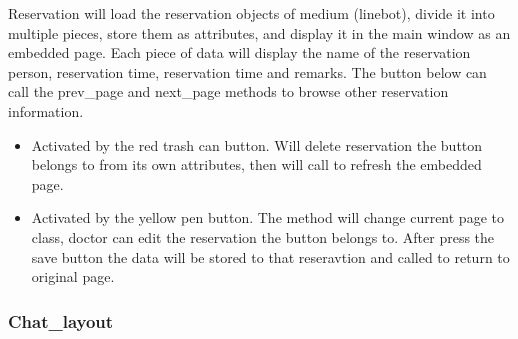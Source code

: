 \documentclass{article}
\begin{document}
Reservation will load the reservation objects of medium (linebot), 
divide it into multiple pieces, store them as attributes, and 
display it in the main window as an embedded page. Each piece of 
data will display the name of the reservation person, reservation 
time, reservation time and remarks. The button below can call the 
prev\_page and next\_page methods to browse other reservation 
information.

\begin{itemize}
  \item {} Activated by the red trash can button. Will delete reservation the button belongs to from its own attributes, then will call  to refresh the embedded page.
  \item {} Activated by the yellow pen button. The method will change current page to  class, doctor can edit the reservation the button belongs to. After press the save button the data will be stored to that reseravtion and called  to return to original page.
\end{itemize}

\subsubsection*{Chat\_layout}
\end{document}
